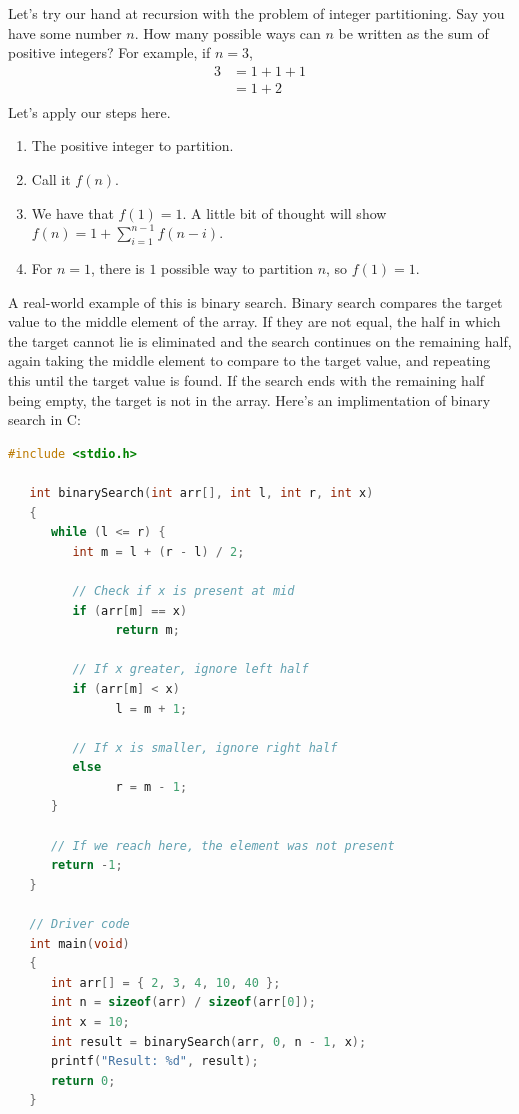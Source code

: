 \documentclass[nobib]{tufte-handout}
\begin{document}
Let's try our hand at recursion with the problem of integer partitioning. 
Say you have some number $n$. How many possible ways can $n$ be written 
as the sum of positive integers? For example, if $n=3$, 
\begin{align*}
   3 &= 1 + 1 + 1 \\
   &= 1 + 2 \\
\end{align*}
Let's apply our steps here. 
\begin{enumerate}
   \item The positive integer to partition. 
   \item Call it $f(n)$.
   \item We have that $f(1) = 1$. A little bit of thought will show 
   $f(n) = 1 + \sum_{i=1}^{n-1} f(n-i)$.
   \item For $n=1$, there is $1$ possible way to partition $n$, 
   so $f(1) = 1$. 
\end{enumerate}

A real-world example of this is binary search. Binary search 
compares the target value to the middle element of the array. 
If they are not equal, the half in which the target cannot 
lie is eliminated and the search continues on the remaining half, 
again taking the middle element to compare to the target value, 
and repeating this until the target value is found. If the search 
ends with the remaining half being empty, the target is 
not in the array. Here's an implimentation of binary search in C: 
\begin{lstlisting}[language=C,caption=Binary search]
   #include <stdio.h>
 
   int binarySearch(int arr[], int l, int r, int x)
   {
      while (l <= r) {
         int m = l + (r - l) / 2;
   
         // Check if x is present at mid
         if (arr[m] == x)
               return m;
   
         // If x greater, ignore left half
         if (arr[m] < x)
               l = m + 1;
   
         // If x is smaller, ignore right half
         else
               r = m - 1;
      }
   
      // If we reach here, the element was not present
      return -1;
   }
   
   // Driver code
   int main(void)
   {
      int arr[] = { 2, 3, 4, 10, 40 };
      int n = sizeof(arr) / sizeof(arr[0]);
      int x = 10;
      int result = binarySearch(arr, 0, n - 1, x);
      printf("Result: %d", result);
      return 0;
   }
\end{lstlisting}
\end{document}
